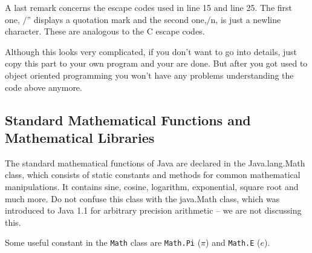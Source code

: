 A last remark concerns the escape codes used in line 15 and line 25.
The first one, $/$'' displays a quotation mark and the second
one,$/$n, 
is just a 
newline character. These are analogous to the C escape codes.

Although this looks very complicated, if you don't want to go into
details, just copy this part to your own program and your are done.
But after you got used to object oriented programming you won't have
any problems understanding the code above anymore.


\subsection{Standard Mathematical Functions and Mathematical Libraries}
\label{sec:Standard_Math}

The standard mathematical functions of Java are declared in the 
Java.lang.Math class, which consists of static constants and methods
for common mathematical manipulations. It contains sine, cosine, logarithm, exponential,
square root and much more. Do not confuse this class with the
java.Math class, which was introduced to Java 1.1 for arbitrary
precision arithmetic -- we are not discussing this.

Some useful constant in the \verb|Math| class  are \verb|Math.Pi|
($\pi$) and \verb|Math.E| ($e$).



